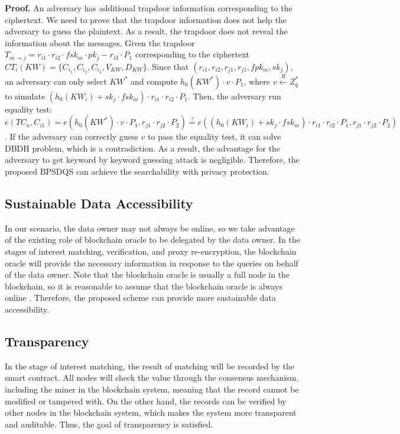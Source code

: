 \documentclass[journal,10pt]{IEEEtran}
\begin{document}
\textbf{Proof.}
An adversary has additional trapdoor information corresponding to the ciphertext. We need to prove that the trapdoor information does not help the adversary to guess the plaintext. As a result, the trapdoor does not reveal the information about the messages.
Given the trapdoor $T_{oi \to j} = r_{i1} \cdot r_{i2} \cdot fsk_{oi} \cdot pk_j - r_{i3} \cdot P_1$ corresponding to the ciphertext $CT_i(KW)=\{C_{i_1}, C_{i_2}, C_{i_3}, V_{KW}, D_{KW}\}$. 
Since that $(r_{i1}, r_{i2}, r_{j1}, r_{j1}, fpk_{oi}, sk_{j})$, an adversary can only select $KW^*$ and compute $h_0(KW^*) \cdot v \cdot P_1$, where $v \xleftarrow{R} Z_q^*$ to simulate $(h_0(KW_i) + sk_j \cdot fsk_{oi}) \cdot r_{i1} \cdot r_{i2} \cdot P_1$.
Then, the adversary run equality test: $e(TC_a, C_{i1}) = e(h_0(KW^*) \cdot v \cdot P_1, r_{j1} \cdot r_{j2} \cdot P_2) \overset{?}{=} e((h_0(KW_i) + sk_j \cdot fsk_{oi}) \cdot r_{i1} \cdot r_{i2} \cdot P_1, r_{j1} \cdot r_{j2} \cdot P_2)$.
If the adversary can correctly guess $v$ to pass the equality test, it can solve DBDH problem, which is a contradiction.
As a result, the advantage for the adversary to get keyword by keyword guessing attack is negligible. Therefore, the proposed BPSDQS can achieve the searchability with privacy protection.


\subsection{Sustainable Data Accessibility}
In our scenario, the data owner may not always be online, so we take advantage of the existing role of blockchain oracle to be delegated by the data owner. In the stages of interest matching, verification, and proxy re-encryption, the blockchain oracle will provide the necessary information in response to the queries on behalf of the data owner. Note that the blockchain oracle is usually a full node in the blockchain, so it is reasonable to assume that the blockchain oracle is always online . Therefore, the proposed scheme can provide more sustainable data accessibility. 

\subsection{Transparency}
In the stage of interest matching, the result of matching will be recorded by the smart contract. All nodes will check the value through the consensus mechanism, including the miner in the blockchain system, meaning that the record cannot be modified or tampered with. On the other hand, the records can be verified by other nodes in the blockchain system, which makes the system more transparent and auditable. Thus, the goal of transparency is satisfied.
\end{document}
